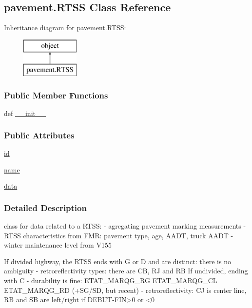 \hypertarget{classpavement_1_1RTSS}{\subsection{pavement.\-R\-T\-S\-S Class Reference}
\label{classpavement_1_1RTSS}
}
Inheritance diagram for pavement.\-R\-T\-S\-S\-:\begin{figure}[H]
\begin{center}
\leavevmode
\includegraphics[height=2.000000cm]{classpavement_1_1RTSS}
\end{center}
\end{figure}
\subsubsection*{Public Member Functions}
\begin{DoxyCompactItemize}
\item 
def \hyperlink{classpavement_1_1RTSS_accb253add6154d04e77369f2ed8b4071}{\-\_\-\-\_\-init\-\_\-\-\_\-}
\end{DoxyCompactItemize}
\subsubsection*{Public Attributes}
\begin{DoxyCompactItemize}
\item 
\hyperlink{classpavement_1_1RTSS_af6b1a0b25e9538d185b2d7b926afe4c2}{id}
\item 
\hyperlink{classpavement_1_1RTSS_a325bf495a68506ef3dc8e9494c7f2ba1}{name}
\item 
\hyperlink{classpavement_1_1RTSS_a331cf07371a3ab480abe67e2238d7515}{data}
\end{DoxyCompactItemize}


\subsubsection{Detailed Description}
\begin{DoxyVerb}class for data related to a RTSS:
- agregating pavement marking measurements
- RTSS characteristics from FMR: pavement type, age, AADT, truck AADT
- winter maintenance level from V155

If divided highway, the RTSS ends with G or D and are distinct: there is no ambiguity
- retroreflectivity types: there are CB, RJ and RB
If undivided, ending with C
- durability is fine: ETAT_MARQG_RG ETAT_MARQG_CL ETAT_MARQG_RD (+SG/SD, but recent)
- retroreflectivity: CJ is center line, RB and SB are left/right if DEBUT-FIN>0 or <0
\end{DoxyVerb}
 

